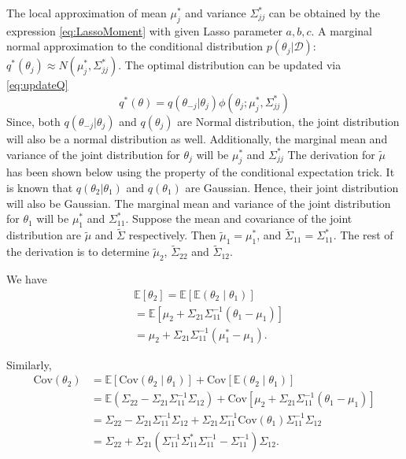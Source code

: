 The local approximation of mean $\mu_j^*$ and variance $\Sigma_{jj}^*$ can be obtained by the expression \autoref{eq:LassoMoment} with given Lasso parameter $a,b,c$. A marginal normal approximation to the conditional distribution $p(\theta_j|\mathcal{D})$: $q^*(\theta_j) \approx N(\mu_j^*,\Sigma_{jj}^*)$. 
The optimal distribution can be updated via \autoref{eq:updateQ}
\begin{equation}
	\label{eq:updateQ}
	q^*(\theta) = q(\theta_{-j}|\theta_j)\phi(\theta_j;\mu_j^*,\Sigma_{jj}^*)
\end{equation} 
Since, both $q(\theta_{-j}|\theta_j)$ and $q(\theta_j)$ are Normal distribution, the joint distribution will also be a normal distribution as well.
Additionally, the marginal mean and variance of the joint distribution for $\theta_j$ will be $\mu_j^*$ and $\Sigma_{jj}^*$
The derivation for $\tilde{\mu}$ has been shown below using the property of the conditional expectation trick.
It is known that $q(\theta_2|\theta_1)$ and $q(\theta_1)$ are Gaussian. Hence, their joint distribution will also be Gaussian. The marginal 
mean and variance of the joint distribution for $\theta_1$ will be $\mu_1^*$
and $\Sigma_{11}^*$. Suppose the mean and covariance of the joint distribution
are $\widetilde{\mu}$ and $\widetilde{\Sigma}$ respectively. Then
$\widetilde{\mu}_1 = \mu_1^*$, and $\widetilde{\Sigma}_{11} = \Sigma_{11}^*$.
The rest of the derivation is to determine $\widetilde{\mu}_{2}$, $\widetilde{\Sigma}_{22}$
and $\widetilde{\Sigma}_{12}$.

\bigskip 
\noindent We have
$$
\begin{array}{rl}
	& \mathbb{E}[\theta_2] = \mathbb{E}[\mathbb{E}(\theta_2\mid\theta_1)] 
	\\ [1ex]
	&  = \mathbb{E}[\mu_2 + \Sigma_{21}\Sigma_{11}^{-1}\left(\theta_1 - \mu_1\right)]
	\\ [1ex]
	& = \mu_2 + \Sigma_{21}\Sigma_{11}^{-1}\left(\mu_1^* - \mu_1\right).
\end{array} 
$$

\noindent Similarly,
$$
\begin{array}{rl}
	\mbox{Cov}(\theta_2) 
	&  = \mathbb{E}[\mbox{Cov}(\theta_2\mid\theta_1)] + \mbox{Cov}[\mathbb{E}(\theta_2\mid\theta_1)] 
	\\ [2ex]
	&  = \mathbb{E}(\Sigma_{22} - \Sigma_{21} \Sigma_{11}^{-1}\Sigma_{12}) + \mbox{Cov}[\mu_2 + \Sigma_{21}\Sigma_{11}^{-1}\left(\theta_1 - \mu_1\right)] 
	\\ [2ex]
	&  = \Sigma_{22} - \Sigma_{21} \Sigma_{11}^{-1}\Sigma_{12}
	+ \Sigma_{21}\Sigma_{11}^{-1}  \mbox{Cov}(\theta_1) \Sigma_{11}^{-1}  \Sigma_{12}
	\\ [2ex]
	&  =  \Sigma_{22} 
	+ \Sigma_{21}(\Sigma_{11}^{-1}  \Sigma_{11}^* \Sigma_{11}^{-1} -\Sigma_{11}^{-1})  \Sigma_{12}.
\end{array} 
$$

